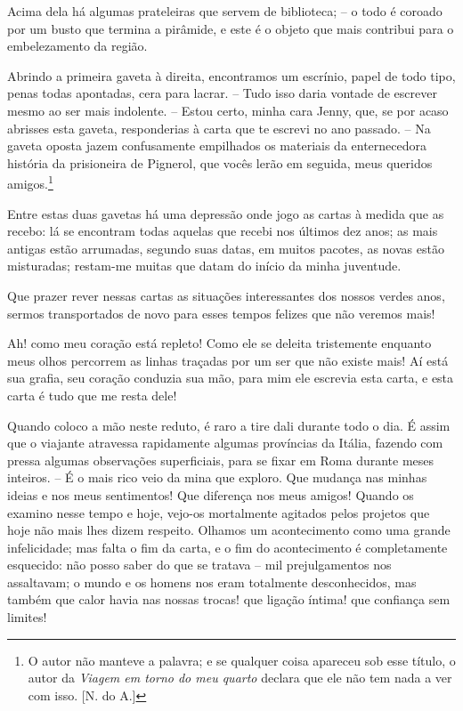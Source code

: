  Acima dela há algumas prateleiras que servem de biblioteca; -- o todo
é coroado por um busto que termina a pirâmide, e este é o objeto que
mais contribui para o embelezamento da região.

 Abrindo a primeira gaveta à direita, encontramos um escrínio, papel de
todo tipo, penas todas apontadas, cera para lacrar. -- Tudo isso daria
vontade de escrever mesmo ao ser mais indolente. -- Estou certo, minha
cara Jenny, que, se por acaso abrisses esta gaveta, responderias à
carta que te escrevi no ano passado. -- Na gaveta oposta jazem
confusamente empilhados os materiais da enternecedora história da
prisioneira de Pignerol, que vocês lerão em seguida, meus queridos
amigos.\footnote{ O autor não manteve a palavra; e se qualquer coisa
apareceu sob esse título, o autor da \textit{Viagem em torno do meu
quarto} declara que ele não tem nada a ver com isso. [N. do A.]} 

 Entre estas duas gavetas há uma depressão onde jogo as cartas à medida
que as recebo: lá se encontram todas aquelas que recebi nos últimos dez
anos; as mais antigas estão arrumadas, segundo suas datas, em muitos
pacotes, as novas estão misturadas; restam-me muitas que datam do
início da minha juventude.

 Que prazer rever nessas cartas as situações interessantes dos nossos
verdes anos, sermos transportados de novo para esses tempos felizes que
não veremos mais!

 Ah! como meu coração está repleto! Como ele se deleita tristemente
enquanto meus olhos percorrem as linhas traçadas por um ser que não
existe mais! Aí está sua grafia, seu coração conduzia sua mão, para mim
ele escrevia esta carta, e esta carta é tudo que me resta dele!

 Quando coloco a mão neste reduto, é raro a tire dali durante todo o
dia. É assim que o viajante atravessa rapidamente algumas províncias da
Itália, fazendo com pressa algumas observações superficiais, para se
fixar em Roma durante meses inteiros. -- É o mais rico veio da mina
que exploro. Que mudança nas minhas ideias e nos meus sentimentos! Que
diferença nos meus amigos! Quando os examino nesse tempo e hoje,
vejo-os mortalmente agitados pelos projetos que hoje não mais lhes
dizem respeito. Olhamos um acontecimento como uma grande infelicidade;
mas falta o fim da carta, e o fim do acontecimento é completamente
esquecido: não posso saber do que se tratava -- mil prejulgamentos
nos assaltavam; o mundo e os homens nos eram totalmente desconhecidos,
mas também que calor havia nas nossas trocas! que ligação íntima! que
confiança sem limites!


